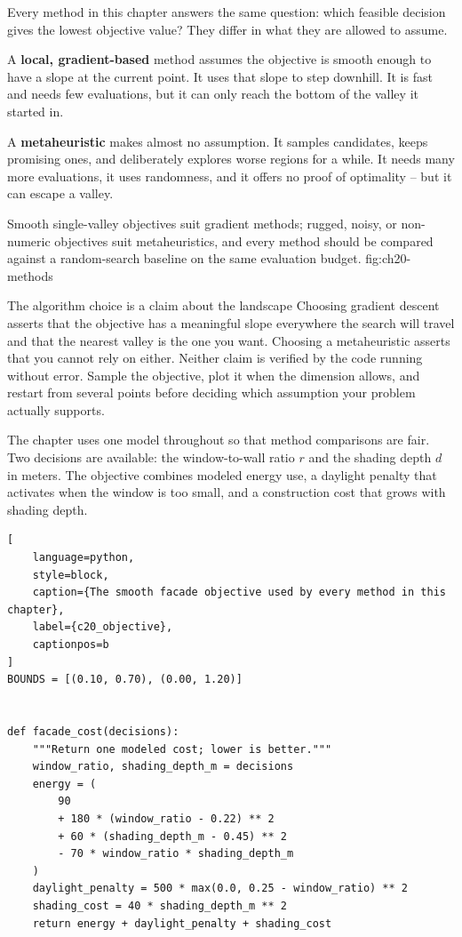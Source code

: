 
Every method in this chapter answers the same question: which feasible decision
gives the lowest objective value? They differ in what they are allowed to
assume.

A \textbf{local, gradient-based} method assumes the objective is smooth enough
to have a slope at the current point. It uses that slope to step downhill. It is
fast and needs few evaluations, but it can only reach the bottom of the valley
it started in.

A \textbf{metaheuristic} makes almost no assumption. It samples candidates,
keeps promising ones, and deliberately explores worse regions for a while. It
needs many more evaluations, it uses randomness, and it offers no proof of
optimality -- but it can escape a valley.

{Smooth single-valley objectives suit gradient methods; rugged, noisy, or non-numeric objectives suit metaheuristics, and every method should be compared against a random-search baseline on the same evaluation budget.}
{fig:ch20-methods}

\begin{ExplainBox}{The algorithm choice is a claim about the landscape}
Choosing gradient descent asserts that the objective has a meaningful slope
everywhere the search will travel and that the nearest valley is the one you
want. Choosing a metaheuristic asserts that you cannot rely on either. Neither
claim is verified by the code running without error. Sample the objective, plot
it when the dimension allows, and restart from several points before deciding
which assumption your problem actually supports.
\end{ExplainBox}


The chapter uses one model throughout so that method comparisons are fair. Two
decisions are available: the window-to-wall ratio $r$ and the shading depth $d$
in meters. The objective combines modeled energy use, a daylight penalty that
activates when the window is too small, and a construction cost that grows with
shading depth.

\begin{lstlisting}[
    language=python,
    style=block,
    caption={The smooth facade objective used by every method in this chapter},
    label={c20_objective},
    captionpos=b
]
BOUNDS = [(0.10, 0.70), (0.00, 1.20)]


def facade_cost(decisions):
    """Return one modeled cost; lower is better."""
    window_ratio, shading_depth_m = decisions
    energy = (
        90
        + 180 * (window_ratio - 0.22) ** 2
        + 60 * (shading_depth_m - 0.45) ** 2
        - 70 * window_ratio * shading_depth_m
    )
    daylight_penalty = 500 * max(0.0, 0.25 - window_ratio) ** 2
    shading_cost = 40 * shading_depth_m ** 2
    return energy + daylight_penalty + shading_cost
\end{lstlisting}

